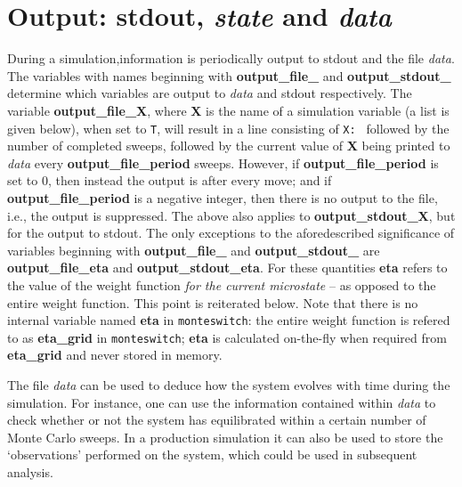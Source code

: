 \documentclass{report}
\begin{document}
\section{Output: stdout, \emph{state} and \emph{data}}\label{sec:output}
During a simulation,information is periodically output to stdout and the file \emph{data}. The variables with names beginning with 
\textbf{output\_file\_} and \textbf{output\_stdout\_} determine which variables are output to \emph{data} and stdout respectively.
The variable \textbf{output\_file\_X}, where \textbf{X} is the name of a simulation variable (a list is given below), when set to \texttt{T}, 
will result in a line consisting of \texttt{X: } followed by the number of completed sweeps, followed by the current value of \textbf{X} 
being printed to \emph{data} every \textbf{output\_file\_period} sweeps. However, if \textbf{output\_file\_period} is set to 0, then instead 
the output is after every move; and if \textbf{output\_file\_period} is a negative integer, then there is no output to the file, i.e., the
output is suppressed. The above also applies to \textbf{output\_stdout\_X}, but for the output to stdout. 
The only exceptions to the aforedescribed significance of variables beginning with \textbf{output\_file\_} and \textbf{output\_stdout\_}
are \textbf{output\_file\_eta} and \textbf{output\_stdout\_eta}. For these quantities \textbf{eta} refers to the
value of the weight function \emph{for the current microstate} -- as opposed to the entire weight function. This point is reiterated below.
Note that there is no internal variable named \textbf{eta} in \verb|monteswitch|: the entire weight function is refered to as \textbf{eta\_grid}
in \verb|monteswitch|; \textbf{eta} is calculated on-the-fly when required from \textbf{eta\_grid} and never stored in memory.

The file \emph{data} can be used to deduce how the system evolves with time during the simulation. For instance, one can use the information contained 
within \emph{data} to check whether or not the system has equilibrated within a certain number of Monte Carlo sweeps. In a production simulation it
can also be used to store the `observations' performed on the system, which could be used in subsequent analysis.
\end{document}
